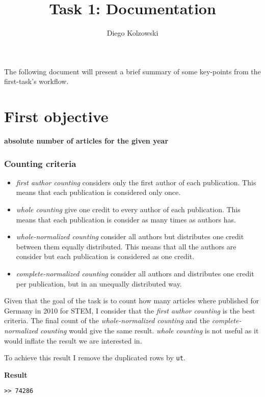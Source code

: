 \documentclass[]{article}
\title{Task 1: Documentation}
\author{Diego Kolzowski}
\date{}
\begin{document}
\maketitle

The following document will present a brief summary of some key-points from the first-task's workflow.  



\section{First objective}

\textbf{absolute number of articles for the given year}

\subsubsection{Counting criteria}

\begin{itemize}
	\item \emph{first author counting} considers only the first author of each
	publication. This means that each publication is considered only once.
	\item \emph{whole counting} give one credit to every author of each
	publication. This means that each publication is consider as many times
	as authors has. 
	\item \emph{whole-normalized counting} consider all authors
	but distributes one credit between them equally distributed. This means
	that all the authors are consider but each publication is considered as
	one credit.
	\item \emph{complete-normalized counting} consider all
	authors and distributes one credit per publication, but in an unequally
	distributed way.
\end{itemize}



Given that the goal of the task is to count how many articles where
published for Germany in 2010 for STEM, I consider that the \emph{first
author counting} is the best criteria. The final count of the
\emph{whole-normalized counting} and the \emph{complete-normalized
counting} would give the same result. \emph{whole counting} is not
useful as it would inflate the result we are interested in.

To achieve this result I remove the duplicated rows by \texttt{ut}.

\textbf{Result}
\begin{verbatim}
>> 74286
\end{verbatim}
\end{document}
